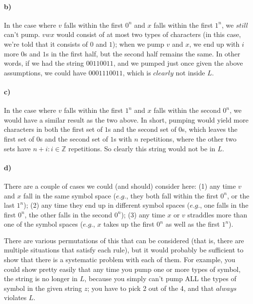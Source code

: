 \documentclass[a4paper]{article}
\begin{document}
\paragraph{b)} In the case where $v$ falls within the first $0^n$ and $x$ falls within the first $1^n$, we $\textit{still}$ can't pump. $vwx$ would consist of at most two types of characters (in this case, we're told that it consists of $0$ and $1$); when we pump $v$ and $x$, we end up with $i$ more $0$s and $1$s in the first half, but the second half remains the same. In other words, if we had the string $00110011$, and we pumped just once given the above assumptions, we could have $0001110011$, which is $\textit{clearly}$ not inside $L$.

\paragraph{c)} In the case where $v$ falls within the first $1^n$ and $x$ falls within the second $0^n$, we would have a similar result as the two above. In short, pumping would yield more characters in both the first set of $1$s and the second set of $0$s, which leaves the first set of $0$s and the second set of $1$s with $n$ repetitions, where the other two sets have $n + i : i \in \mathbb{Z}$ repetitions. So clearly this string would not be in $L$.

\paragraph{d)} There are a couple of cases we could (and should) consider here: (1) any time $v$ and $x$ fall in the same symbol space ($\textit{e.g.}$, they both fall within the first $0^n$, or the last $1^n$); (2) any time they end up in different symbol spaces ($\textit{e.g.}$, one falls in the first $0^n$, the other falls in the second $0^n$); (3) any time $x$ or $v$ straddles more than one of the symbol spaces ($\textit{e.g.}$, $x$ takes up the first $0^n$ as well as the first $1^n$).

There are various permutations of this that can be considered (that is, there are multiple situations that satisfy each rule), but it would probably be sufficient to show that there is a systematic problem with each of them. For example, you could show pretty easily that any time you pump one or more types of symbol, the string is no longer in $L$, because you simply can't pump ALL the types of symbol in the given string $z$; you have to pick 2 out of the 4, and that $\textit{always}$ violates $L$.
\end{document}

